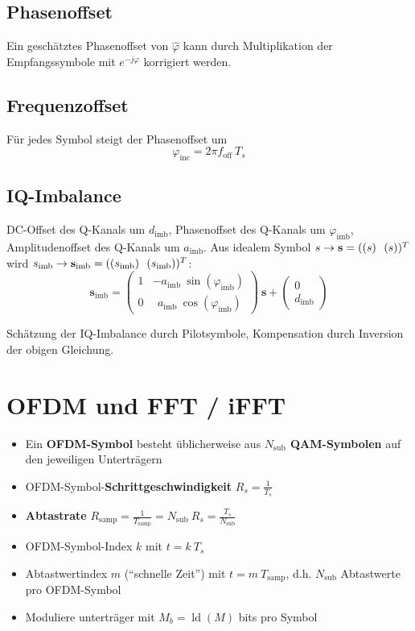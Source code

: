 \documentclass[a4paper, 11pt]{article}
\DeclareMathOperator{\ld}{ld}
\let\Re\relax
\let\Im\relax
\DeclareMathOperator{\Re}{Re}
\DeclareMathOperator{\Im}{Im}
\begin{document}
\subsection*{Phasenoffset}
Ein geschätztes Phasenoffset von $\hat \varphi$ kann durch Multiplikation der Empfangssymbole mit $e^{-j \varphi}$ korrigiert werden.

\subsection*{Frequenzoffset}
Für jedes Symbol steigt der Phasenoffset um
\[
	\varphi_{\mathrm{inc}} = 2 \pi f_{\mathrm{off}} ~ T_s
\]

\subsection*{IQ-Imbalance}
DC-Offset des Q-Kanals um $d_{\mathrm{imb}}$, Phasenoffset des Q-Kanals um $\varphi_{\mathrm{imb}}$, Amplitudenoffset des Q-Kanals um $a_{\mathrm{imb}}$. Aus idealem Symbol $s \rightarrow \mathbf s = (\Re(s) ~~ \Im(s))^T$ wird $s_{\mathrm{imb}} \rightarrow \mathbf s_{\mathrm{imb}} = (\Re(s_{\mathrm{imb}}) ~~ \Im(s_{\mathrm{imb}}))^T$:
\[
	\mathbf s_{\mathrm{imb}} = \begin{pmatrix}
		1 & -a_\mathrm{imb} ~ \sin(\varphi_\mathrm{imb}) \\
		0 & ~~ a_\mathrm{imb} ~ \cos(\varphi_\mathrm{imb})
	\end{pmatrix} ~ \mathbf s + \begin{pmatrix}
		0 \\
		d_\mathrm{imb}
	\end{pmatrix}
\]

Schätzung der IQ-Imbalance durch Pilotsymbole, Kompensation durch Inversion der obigen Gleichung.

\section*{OFDM und FFT / iFFT}
\begin{itemize}
\item Ein \textbf{OFDM-Symbol} besteht üblicherweise aus \textbf{$N_{\mathrm{sub}}$ QAM-Symbolen} auf den jeweiligen Unterträgern
\item OFDM-Symbol-\textbf{Schrittgeschwindigkeit} $R_s = \frac{1}{T_s}$
\item \textbf{Abtastrate} $R_{\mathrm{samp}} = \frac{1}{T_{\mathrm{samp}}} = N_{\mathrm{sub}} ~ R_s = \frac{T_s}{N_{\mathrm{sub}}}$
\item OFDM-Symbol-Index $k$ mit $t = k ~ T_s$
\item Abtastwertindex $m$ (``schnelle Zeit'') mit $t = m ~ T_{\mathrm{samp}}$, d.h. $N_{\mathrm{sub}}$ Abtastwerte pro OFDM-Symbol
\item Moduliere unterträger mit $M_b = \ld(M)$ bits pro Symbol
\end{itemize}
\end{document}
